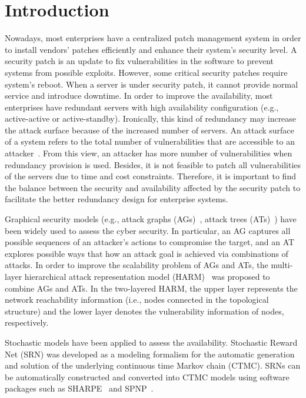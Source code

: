 \documentclass[conference]{IEEEtran}
\begin{document}
\section{Introduction}
Nowadays, most enterprises have a centralized patch management system in order to install vendors’ patches efficiently and enhance their system’s security level. A security patch is an update to fix vulnerabilities in the software to prevent systems from possible exploits. However, some critical security patches require system’s reboot. When a server is under security patch, it cannot provide normal service and introduce downtime. In order to improve the availability, most enterprises have redundant servers with high availability configuration (e.g., active-active or active-standby). Ironically, this kind of redundancy may increase the attack surface because of the increased number of servers. An attack surface of a system refers to the total number of vulnerabilities that are accessible to an attacker~\cite{Manadhata2011SE}. From this view, an attacker has more number of vulnerabilities when redundancy provision is used. Besides, it is not feasible to patch all vulnerabilities of the servers due to time and cost constraints. Therefore, it is important to find the balance between the security and availability affected by the security patch to facilitate the better redundancy design for enterprise systems.

Graphical security models (e.g., attack graphs (AGs)~\cite{Sheyner2002SP}, attack trees (ATs)~\cite{Saini2008JCSC}) have been widely used to assess the cyber security. In particular, an AG captures all possible sequences of an attacker's actions to compromise the target, and an AT explores possible ways that how an attack goal is achieved via combinations of attacks. In order to improve the scalability problem of AGs and ATs, the multi-layer hierarchical attack representation model (HARM)~\cite{Hong2016JNCA} was proposed to combine AGs and ATs. In the two-layered HARM, the upper layer represents the network reachability information (i.e., nodes connected in the topological structure) and the lower layer denotes the vulnerability information of nodes, respectively.

Stochastic models have been applied to assess the availability. Stochastic Reward Net (SRN) was developed as a modeling formalism for the automatic generation and solution of the underlying continuous time Markov chain (CTMC). SRNs can be automatically constructed and converted into CTMC models using software packages such as SHARPE~\cite{Trived2009SHARPE} and SPNP~\cite{Ciardo1989SPNP}.
\end{document}
